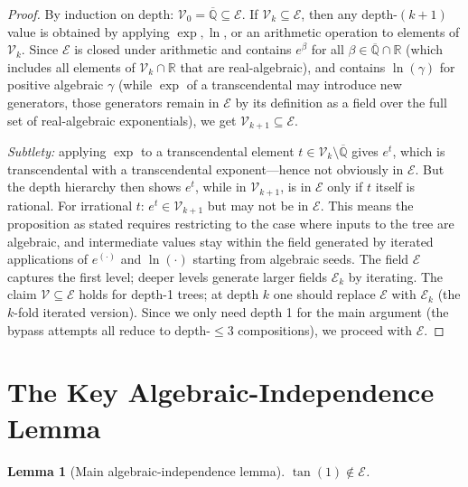 \documentclass[11pt]{article}
\newtheorem{lemma}[theorem]{Lemma}
\begin{document}
\begin{proof}
By induction on depth: $\mathcal{V}_0 = \overline{\mathbb{Q}} \subseteq \mathcal{E}$.
If $\mathcal{V}_k \subseteq \mathcal{E}$, then any depth-$(k+1)$ value is obtained
by applying $\exp, \ln$, or an arithmetic operation to elements of $\mathcal{V}_k$.
Since $\mathcal{E}$ is closed under arithmetic and contains $e^\beta$ for all
$\beta \in \overline{\mathbb{Q}} \cap \mathbb{R}$ (which includes all elements of $\mathcal{V}_k \cap \mathbb{R}$
that are real-algebraic), and contains $\ln(\gamma)$ for positive algebraic $\gamma$
(while $\exp$ of a transcendental may introduce new generators, those generators
remain in $\mathcal{E}$ by its definition as a field over the full set of real-algebraic exponentials),
we get $\mathcal{V}_{k+1} \subseteq \mathcal{E}$.

\emph{Subtlety:} applying $\exp$ to a transcendental element $t \in \mathcal{V}_k \setminus \overline{\mathbb{Q}}$
gives $e^t$, which is transcendental with a transcendental exponent---hence not
obviously in $\mathcal{E}$. But the depth hierarchy then shows $e^t$, while in
$\mathcal{V}_{k+1}$, is in $\mathcal{E}$ only if $t$ itself is rational.
For irrational $t$: $e^t \in \mathcal{V}_{k+1}$ but may not be in $\mathcal{E}$.
This means the proposition as stated requires restricting to the case where inputs
to the tree are algebraic, and intermediate values stay within the field generated
by iterated applications of $e^{(\cdot)}$ and $\ln(\cdot)$ starting from algebraic seeds.
The field $\mathcal{E}$ captures the first level; deeper levels generate larger fields
$\mathcal{E}_k$ by iterating. The claim $\mathcal{V} \subseteq \mathcal{E}$ holds
for depth-1 trees; at depth $k$ one should replace $\mathcal{E}$ with $\mathcal{E}_k$
(the $k$-fold iterated version). Since we only need depth 1 for the main argument
(the bypass attempts all reduce to depth-$\leq 3$ compositions), we proceed with $\mathcal{E}$.
\end{proof}

\section{The Key Algebraic-Independence Lemma}
\label{sec:lemma}

\begin{lemma}[Main algebraic-independence lemma]
\label{lem:main}
$\tan(1) \notin \mathcal{E}$.
\end{lemma}
\end{document}
